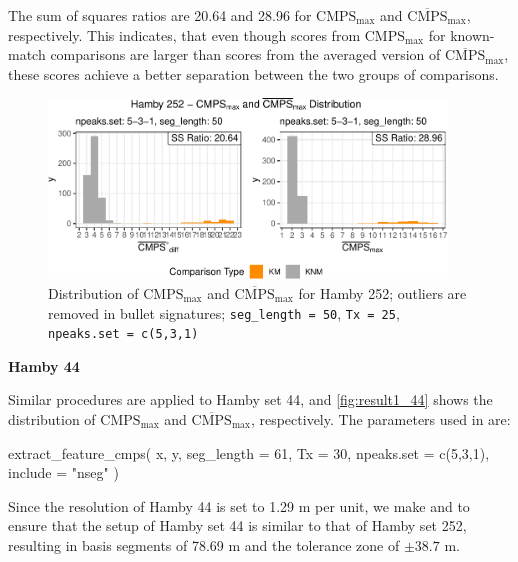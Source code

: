 The sum of squares ratios are 20.64 and 28.96 for
\(\mathrm{CMPS_{max}}\) and \(\mathrm{\overline{CMPS}_{max}}\),
respectively. This indicates, that even though scores from
\(\mathrm{CMPS_{max}}\) for known-match comparisons are larger than
scores from the averaged version of \(\mathrm{\overline{CMPS}_{max}}\),
these scores achieve a better separation between the two groups of
comparisons.

\begin{Schunk}
\begin{figure}

{\centering \includegraphics[width=400px]{ju-hofmann_files/figure-latex/result1_252-1} 

}

\caption{Distribution of $\mathrm{CMPS_{max}}$ and $\mathrm{\overline{CMPS}_{max}}$ for Hamby 252; outliers are removed in bullet signatures; \texttt{seg\_length = 50}, \texttt{Tx = 25}, \texttt{npeaks.set = c(5,3,1)} }\label{fig:result1_252}
\end{figure}
\end{Schunk}

\textbf{Hamby 44}

Similar procedures are applied to Hamby set 44, and
\autoref{fig:result1_44} shows the distribution of
\(\mathrm{CMPS_{max}}\) and \(\mathrm{\overline{CMPS}_{max}}\),
respectively. The parameters used in  are:

\begin{Schunk}
\begin{Sinput}
extract_feature_cmps(
  x, y,
  seg_length = 61, 
  Tx = 30,
  npeaks.set = c(5,3,1),
  include = "nseg"
)
\end{Sinput}
\end{Schunk}

Since the resolution of Hamby 44 is set to 1.29 \textmu m per unit, we
make  and  to ensure that the setup
of Hamby set 44 is similar to that of Hamby set 252, resulting in basis
segments of 78.69 \textmu m and the tolerance zone of \(\pm 38.7\)
\textmu m.

